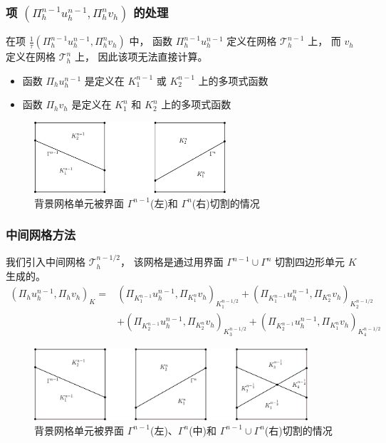 \documentclass[notheorems,serif]{beamer}
\begin{document}
\begin{frame}
    \frametitle{项 $(\Pi_h^{n-1} u_h^{n-1},\Pi_h^n v_h)$ 的处理}
在项 $\frac{1}{\tau}( \Pi_h^{n-1} u_h^{n-1}, \Pi_h^n v_h)$ 中，
函数 $\Pi_h^{n-1} u^{n-1}_h$ 定义在网格 $\mathcal{T}_h^{n-1}$ 上，
而 $v_h$ 定义在网格 $\mathcal{T}_h^n$ 上，
因此该项无法直接计算。
\begin{itemize}
    \item 函数 $\Pi_h u_h^{n-1}$ 是定义在 $K_1^{n-1}$ 或 $K_2^{n-1}$ 上的多项式函数
    \item 函数 $\Pi_h v_h$ 是定义在 $K_1^n$ 和 $K_2^n$ 上的多项式函数
\end{itemize}

\begin{figure}[h]
    \centering
    \includegraphics[width=2.8in]{../figures/movingmaxwell/backcell_be_cuted.pdf}
    \caption{\small 背景网格单元被界面 $\Gamma^{n-1}$(左)和 $\Gamma^n$(右)切割的情况}
    \label{fig:overlapmesh}
\end{figure}
\end{frame}

\begin{frame}
    \frametitle{中间网格方法}
\small
我们引入中间网格 $\mathcal{T}_h^{n-1/2}$，
该网格是通过用界面 $\Gamma^{n-1}\cup\Gamma^n$ 切割四边形单元 $K$ 生成的。
$$
\begin{aligned}
    (\Pi_h u_h^{n-1}, \Pi_h v_h)_K =
    &
    (\Pi_{K_1^{n-1}}u_h^{n-1}, \Pi_{K_1^{n}}v_h)_{K_1^{n-1/2}}
    +
    (\Pi_{K_1^{n-1}}u_h^{n-1}, \Pi_{K_2^{n}}v_h)_{K_2^{n-1/2}}\\
    & +
    (\Pi_{K_2^{n-1}}u_h^{n-1}, \Pi_{K_2^{n}}v_h)_{K_3^{n-1/2}}
    +
    (\Pi_{K_2^{n-1}}u_h^{n-1}, \Pi_{K_1^{n}}v_h)_{K_4^{n-1/2}}
\end{aligned}
$$

\begin{figure}[h]
    \centering
    \includegraphics[width=4in]{../figures/movingmaxwell/overlap_interface.pdf}
    \caption{\small 背景网格单元被界面 $\Gamma^{n-1}$(左)、$\Gamma^n$(中)和 $\Gamma^{n-1} \cup \Gamma^n$(右)切割的情况}
    \label{fig:overlapmesh}
\end{figure}
\end{frame}
\end{document}
